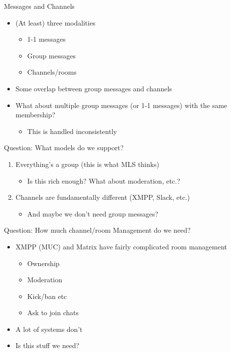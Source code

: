 \documentclass[helvetica]{beamer}
\begin{document}
\begin{frame}{Messages and Channels}
  \begin{itemize}
  \item (At least) three modalities
    \begin{itemize}
    \item 1-1 messages
        \item Group messages
    \item Channels/rooms
    \end{itemize}
    
  \item Some overlap between group messages and channels
  \item What about multiple group messages (or 1-1 messages) with the same membership?
    \begin{itemize}
    \item This is handled inconsistently
    \end{itemize}
  \end{itemize}
\end{frame}

\begin{frame}{Question: What models do we support?}

  \begin{enumerate}
  \item Everything's a group (this is what MLS thinks)
    \begin{itemize}
    \item Is this rich enough? What about moderation, etc.?      
    \end{itemize}
  \item Channels are fundamentally different (XMPP, Slack, etc.)
    \begin{itemize}
    \item And maybe we don't need group messages?
      \end{itemize}
  \end{enumerate}
\end{frame}


\begin{frame}{Question: How much channel/room Management do we need?}

  \begin{itemize}
  \item XMPP (MUC) and Matrix have fairly complicated room management
    \begin{itemize}
    \item Ownership
    \item Moderation
    \item Kick/ban etc
    \item Ask to join chats
    \end{itemize}
  \item A lot of systems don't
  \item Is this stuff we need?
  \end{itemize}

\end{frame}
\end{document}
